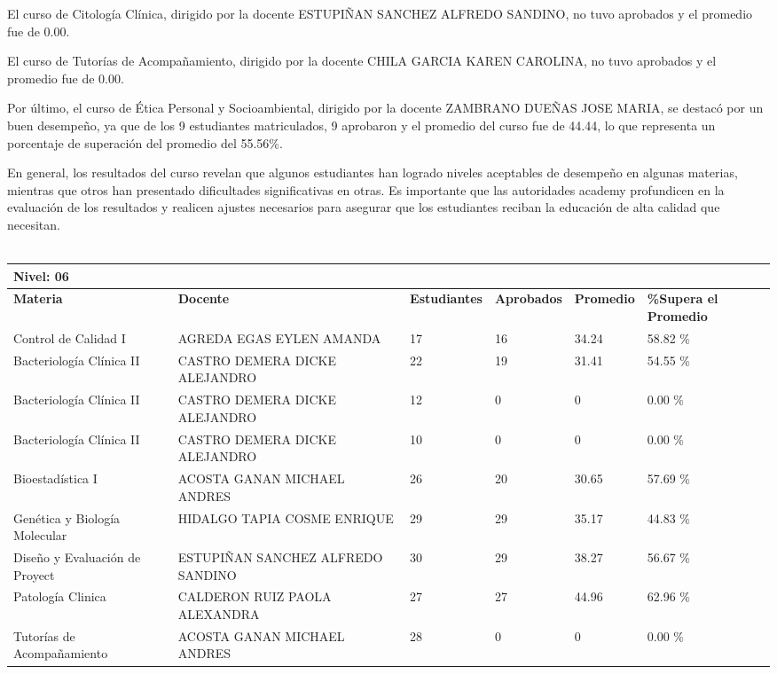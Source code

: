 El curso de Citología Clínica, dirigido por la docente ESTUPIÑAN SANCHEZ ALFREDO SANDINO, no tuvo aprobados y el promedio fue de 0.00.

El curso de Tutorías de Acompañamiento, dirigido por la docente CHILA GARCIA KAREN CAROLINA, no tuvo aprobados y el promedio fue de 0.00.

Por último, el curso de Ética Personal y Socioambiental, dirigido por la docente ZAMBRANO DUEÑAS JOSE MARIA, se destacó por un buen desempeño, ya que de los 9 estudiantes matriculados, 9 aprobaron y el promedio del curso fue de 44.44, lo que representa un porcentaje de superación del promedio del 55.56\%.

En general, los resultados del curso revelan que algunos estudiantes han logrado niveles aceptables de desempeño en algunas materias, mientras que otros han presentado dificultades significativas en otras. Es importante que las autoridades academy profundicen en la evaluación de los resultados y realicen ajustes necesarios para asegurar que los estudiantes reciban la educación de alta calidad que necesitan.\\
\vspace{1cm}\\\small
\begin{tabularx}{\textwidth}{|p{2.5cm}|p{2.5cm}|X|X|X|X|}
\hline
\multicolumn{6}{|X|}{\textbf{Nivel: 06 }}\\\hline\textbf{Materia} & \textbf{Docente} & \textbf{Estudiantes} & \textbf{Aprobados} & \textbf{Promedio} & \textbf{\%Supera el Promedio} \\ \hline
Control de Calidad I & AGREDA EGAS EYLEN AMANDA & 17 & 16 & 34.24 & 58.82 \%\\ \hline
Bacteriología Clínica II & CASTRO DEMERA DICKE ALEJANDRO & 22 & 19 & 31.41 & 54.55 \%\\ \hline
Bacteriología Clínica II & CASTRO DEMERA DICKE ALEJANDRO & 12 & 0 & 0 & 0.00 \%\\ \hline
Bacteriología Clínica II & CASTRO DEMERA DICKE ALEJANDRO & 10 & 0 & 0 & 0.00 \%\\ \hline
Bioestadística I & ACOSTA GANAN MICHAEL ANDRES & 26 & 20 & 30.65 & 57.69 \%\\ \hline
Genética y Biología Molecular & HIDALGO TAPIA COSME ENRIQUE & 29 & 29 & 35.17 & 44.83 \%\\ \hline
Diseño y Evaluación de Proyect & ESTUPIÑAN SANCHEZ ALFREDO SANDINO & 30 & 29 & 38.27 & 56.67 \%\\ \hline
Patología Clinica & CALDERON RUIZ PAOLA ALEXANDRA & 27 & 27 & 44.96 & 62.96 \%\\ \hline
Tutorías de Acompañamiento & ACOSTA GANAN MICHAEL ANDRES & 28 & 0 & 0 & 0.00 \%\\ \hline
\end{tabularx}

